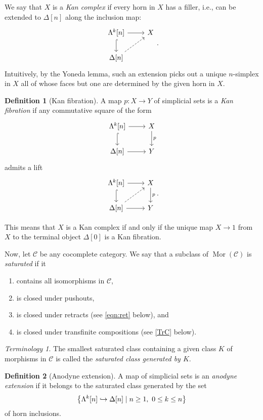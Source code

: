 \documentclass[10pt,letterpaper,cm]{nupset}
\theoremstyle{definition}
\newtheorem{definition}{Definition}[subsection]
\theoremstyle{theorem}
\theoremstyle{remark}
\newtheorem*{term}{Terminology}
\DeclareMathOperator{\mor}{Mor}
\newcommand{\0}{\mathbf{0}}
\newcommand{\1}{\mathbf{1}}
\newcommand{\2}{\mathbf{2}}
\renewcommand{\c}{\mathscr{C}}
\newcommand{\be}{\begin{enumerate}}
\newcommand{\ee}{\end{enumerate}}
\begin{document}
We say that $X$ is a \textit{Kan complex} if every horn in $X$ has a filler, i.e., can be extended to $\Delta[n]$ along the inclusion map:
\[
\begin{tikzcd}
{\Lambda^k[n]} \arrow[d, hook] \arrow[r] & X \\
\Delta[n] \arrow[ru, dashed]              &  
\end{tikzcd}
.\]
Intuitively, by the Yoneda lemma, such an extension picks out a unique $n$-simplex in $X$ all of whose faces but one are determined by the given horn in $X$. 


\begin{definition}[Kan fibration]\label{KF}
A map $p: X\to Y$ of simplicial sets is a \textit{Kan fibration} if any commutative square of the form
\[
\begin{tikzcd}
{\Lambda^k[n]} \arrow[d, hook] \arrow[r] & X \arrow[d, "p"] \\
\Delta[n] \arrow[r]                       & Y               
\end{tikzcd}
\] admits a lift
\[
\begin{tikzcd}
{\Lambda^k[n]} \arrow[d, hook] \arrow[r] & X \arrow[d, "p"] \\
\Delta[n] \arrow[r] \arrow[ru, dashed]    & Y               
\end{tikzcd}.
\]
\end{definition}

This means that $X$ is a Kan complex if and only if the unique map $X \to 1$ from $X$ to the terminal object $\Delta[0]$ is a Kan fibration.

\medskip

Now, let $\c$ be any cocomplete category. We say that a subclass of $\mor(\c)$ is \textit{saturated} if it
\be[label=(\roman*)]
\item contains all isomorphisms in $\c$,
\item is closed under pushouts,
\item is closed under retracts (see \eqref{eqn:ret} below), and
\item is closed under transfinite compositions (see \cref{TrC} below).
\ee

\begin{term}
The smallest saturated class containing a given class $K$ of morphisms in $\c$ is called the \textit{saturated class generated by $K$}.
\end{term}

\begin{definition}[Anodyne extension]\label{anodyne}
A map of simplicial sets is an \textit{anodyne extension} if it belongs to the saturated class  generated by the set 
\[
\mleft\{\Lambda^k[n] \hookrightarrow \Delta[n] \mid n\geq 1, \ 0\leq k \leq n\mright\}
\] of horn inclusions.
\end{definition}
\end{document}
